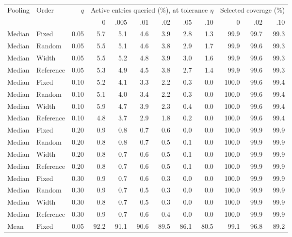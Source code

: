 \begin{table}[t]
\centering\small\setlength{\tabcolsep}{3pt}
\begin{tabular}{llrrrrrrrrrr}
\toprule
Pooling & Order & $q$ & \multicolumn{6}{c}{Active entries queried (\%), at tolerance $\eta$} & \multicolumn{3}{c}{Selected coverage (\%)} \\
\cmidrule(lr){4-9}\cmidrule(lr){10-12}
 & & & 0 & .005 & .01 & .02 & .05 & .10 & 0 & .02 & .10 \\
\midrule
Median & Fixed & 0.05 & 5.7 & 5.1 & 4.6 & 3.9 & 2.8 & 1.3 & 99.9 & 99.7 & 99.3 \\
Median & Random & 0.05 & 5.5 & 5.1 & 4.6 & 3.8 & 2.9 & 1.7 & 99.9 & 99.6 & 99.3 \\
Median & Width & 0.05 & 5.5 & 5.2 & 4.8 & 3.9 & 3.0 & 1.6 & 99.9 & 99.6 & 99.3 \\
Median & Reference & 0.05 & 5.3 & 4.9 & 4.5 & 3.8 & 2.7 & 1.4 & 99.9 & 99.6 & 99.3 \\
\addlinespace
Median & Fixed & 0.10 & 5.2 & 4.1 & 3.3 & 2.2 & 0.3 & 0.0 & 100.0 & 99.6 & 99.4 \\
Median & Random & 0.10 & 5.1 & 4.0 & 3.4 & 2.2 & 0.3 & 0.0 & 100.0 & 99.6 & 99.4 \\
Median & Width & 0.10 & 5.9 & 4.7 & 3.9 & 2.3 & 0.4 & 0.0 & 100.0 & 99.6 & 99.4 \\
Median & Reference & 0.10 & 4.8 & 3.7 & 2.9 & 1.8 & 0.2 & 0.0 & 100.0 & 99.6 & 99.4 \\
\addlinespace
Median & Fixed & 0.20 & 0.9 & 0.8 & 0.7 & 0.6 & 0.0 & 0.0 & 100.0 & 99.9 & 99.9 \\
Median & Random & 0.20 & 0.8 & 0.8 & 0.7 & 0.5 & 0.1 & 0.0 & 100.0 & 99.9 & 99.9 \\
Median & Width & 0.20 & 0.8 & 0.7 & 0.6 & 0.5 & 0.1 & 0.0 & 100.0 & 99.9 & 99.9 \\
Median & Reference & 0.20 & 0.8 & 0.7 & 0.6 & 0.5 & 0.1 & 0.0 & 100.0 & 99.9 & 99.9 \\
\addlinespace
Median & Fixed & 0.30 & 0.9 & 0.7 & 0.6 & 0.3 & 0.0 & 0.0 & 100.0 & 99.9 & 99.9 \\
Median & Random & 0.30 & 0.9 & 0.7 & 0.5 & 0.3 & 0.0 & 0.0 & 100.0 & 99.9 & 99.9 \\
Median & Width & 0.30 & 0.8 & 0.7 & 0.5 & 0.3 & 0.0 & 0.0 & 100.0 & 99.9 & 99.9 \\
Median & Reference & 0.30 & 0.9 & 0.7 & 0.6 & 0.4 & 0.0 & 0.0 & 100.0 & 99.9 & 99.9 \\
\addlinespace
\midrule
Mean & Fixed & 0.05 & 92.2 & 91.1 & 90.6 & 89.5 & 86.1 & 80.5 & 99.1 & 96.8 & 89.2 \\

\end{tabular}
\end{table}
